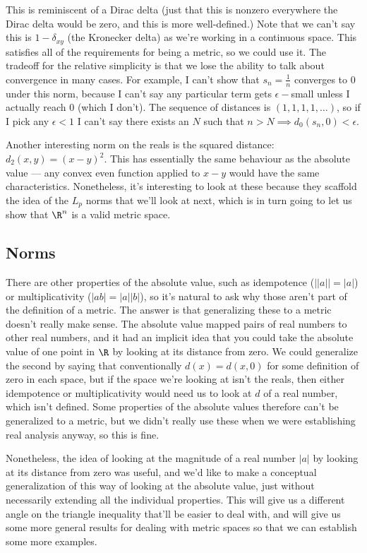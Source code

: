 \documentclass[../analysis.tex]{subfiles}
\begin{document}
    This is reminiscent of a Dirac delta (just that this is nonzero everywhere the Dirac delta would be zero, and this is more well-defined.) Note that we can't say this is $1 - \delta_{xy}$ (the Kronecker delta) as we're working in a continuous space. This satisfies all of the requirements for being a metric, so we could use it. The tradeoff for the relative simplicity is that we lose the ability to talk about convergence in many cases. For example, I can't show that $s_n = \frac{1}{n}$ converges to 0 under this norm, because I can't say any particular term gets $\epsilon-$small unless I actually reach 0 (which I don't). The sequence of distances is $(1, 1, 1, 1, \dots)$, so if I pick any $\epsilon < 1$ I can't say there exists an $N$ such that $n > N \implies d_0(s_n, 0) < \epsilon$.

    Another interesting norm on the reals is the squared distance: $d_2(x, y) = (x - y)^2$. This has essentially the same behaviour as the absolute value --- any convex even function applied to $x - y$ would have the same characteristics. Nonetheless, it's interesting to look at these because they scaffold the idea of the $L_p$ norms that we'll look at next, which is in turn going to let us show that $\R^n$ is a valid metric space.

    \subsection{Norms}

    There are other properties of the absolute value, such as idempotence ($||a|| = |a|$) or multiplicativity ($|ab| = |a||b|$), so it's natural to ask why those aren't part of the definition of a metric. The answer is that generalizing these to a metric doesn't really make sense. The absolute value mapped pairs of real numbers to other real numbers, and it had an implicit idea that you could take the absolute value of one point in $\R$ by looking at its distance from zero. We could generalize the second by saying that conventionally $d(x) = d(x, 0)$ for some definition of zero in each space, but if the space we're looking at isn't the reals, then either idempotence or multiplicativity would need us to look at $d$ of a real number, which isn't defined. Some properties of the absolute values therefore can't be generalized to a metric, but we didn't really use these when we were establishing real analysis anyway, so this is fine.

    Nonetheless, the idea of looking at the magnitude of a real number $|a|$ by looking at its distance from zero was useful, and we'd like to make a conceptual generalization of this way of looking at the absolute value, just without necessarily extending all the individual properties. This will give us a different angle on the triangle inequality that'll be easier to deal with, and will give us some more general results for dealing with metric spaces so that we can establish some more examples.
\end{document}
